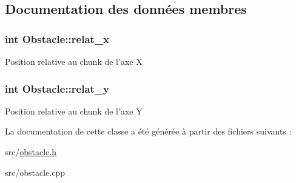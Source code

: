 \subsection{Documentation des données membres}
\hypertarget{class_obstacle_a37056563c8469b38aa240c7c423d7280}{
\subsubsection[{relat\+\_\+x}]{\setlength{\rightskip}{0pt plus 5cm}int Obstacle\+::relat\+\_\+x\hspace{0.3cm}{\ttfamily [protected]}}}\label{class_obstacle_a37056563c8469b38aa240c7c423d7280}
Position relative au chunk de l'axe X \hypertarget{class_obstacle_a754f463db00e74fd5d66a758e4458c26}{
\subsubsection[{relat\+\_\+y}]{\setlength{\rightskip}{0pt plus 5cm}int Obstacle\+::relat\+\_\+y\hspace{0.3cm}{\ttfamily [protected]}}}\label{class_obstacle_a754f463db00e74fd5d66a758e4458c26}
Position relative au chunk de l'axe Y 

La documentation de cette classe a été générée à partir des fichiers suivants \+:\begin{DoxyCompactItemize}
\item 
src/\hyperlink{obstacle_8h}{obstacle.\+h}\item 
src/obstacle.\+cpp\end{DoxyCompactItemize}
